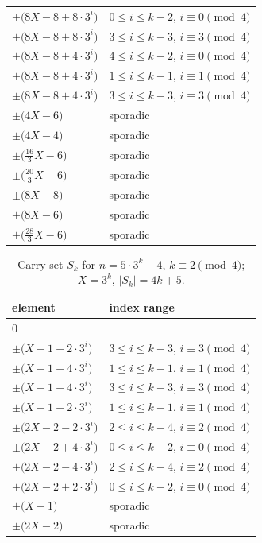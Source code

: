 \begin{table}[htbp]
\begin{tabular}{ll}
$\pm\bigl(8X - 8 + 8\cdot 3^i\bigr)$ & $0\le i\le k-2$, $i\equiv 0\pmod 4$ \\
$\pm\bigl(8X - 8 + 8\cdot 3^i\bigr)$ & $3\le i\le k-3$, $i\equiv 3\pmod 4$ \\
$\pm\bigl(8X - 8 + 4\cdot 3^i\bigr)$ & $4\le i\le k-2$, $i\equiv 0\pmod 4$ \\
$\pm\bigl(8X - 8 + 4\cdot 3^i\bigr)$ & $1\le i\le k-1$, $i\equiv 1\pmod 4$ \\
$\pm\bigl(8X - 8 + 4\cdot 3^i\bigr)$ & $3\le i\le k-3$, $i\equiv 3\pmod 4$ \\
$\pm\bigl(4X - 6\bigr)$ & sporadic \\
$\pm\bigl(4X - 4\bigr)$ & sporadic \\
$\pm\bigl(\tfrac{16}{3}X - 6\bigr)$ & sporadic \\
$\pm\bigl(\tfrac{20}{3}X - 6\bigr)$ & sporadic \\
$\pm\bigl(8X - 8\bigr)$ & sporadic \\
$\pm\bigl(8X - 6\bigr)$ & sporadic \\
$\pm\bigl(\tfrac{28}{3}X - 6\bigr)$ & sporadic \\
\bottomrule\end{tabular}\end{table}

\begin{table}[htbp]\centering\small
\caption{Carry set $S_k$ for $n=5\cdot 3^k - 4$, $k\equiv 2\pmod{4}$; $X=3^k$, $|S_k|=4k+5$.}
\begin{tabular}{ll}\toprule
element & index range \\ \midrule
$0$ & \\
$\pm\bigl(X - 1 - 2\cdot 3^i\bigr)$ & $3\le i\le k-3$, $i\equiv 3\pmod 4$ \\
$\pm\bigl(X - 1 + 4\cdot 3^i\bigr)$ & $1\le i\le k-1$, $i\equiv 1\pmod 4$ \\
$\pm\bigl(X - 1 - 4\cdot 3^i\bigr)$ & $3\le i\le k-3$, $i\equiv 3\pmod 4$ \\
$\pm\bigl(X - 1 + 2\cdot 3^i\bigr)$ & $1\le i\le k-1$, $i\equiv 1\pmod 4$ \\
$\pm\bigl(2X - 2 - 2\cdot 3^i\bigr)$ & $2\le i\le k-4$, $i\equiv 2\pmod 4$ \\
$\pm\bigl(2X - 2 + 4\cdot 3^i\bigr)$ & $0\le i\le k-2$, $i\equiv 0\pmod 4$ \\
$\pm\bigl(2X - 2 - 4\cdot 3^i\bigr)$ & $2\le i\le k-4$, $i\equiv 2\pmod 4$ \\
$\pm\bigl(2X - 2 + 2\cdot 3^i\bigr)$ & $0\le i\le k-2$, $i\equiv 0\pmod 4$ \\
$\pm\bigl(X - 1\bigr)$ & sporadic \\
$\pm\bigl(2X - 2\bigr)$ & sporadic \\
\bottomrule\end{tabular}\end{table}

